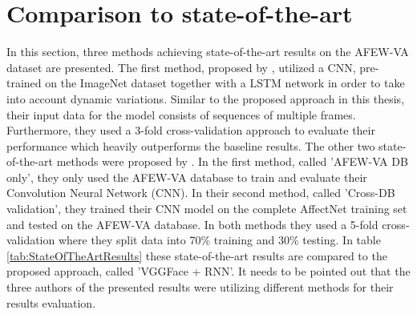 \section{Comparison to state-of-the-art}
In this section, three methods achieving state-of-the-art results on the AFEW-VA dataset are presented. The first method, proposed by \citet{Theagarajan:2018:DeepDriver}, utilized a CNN, pre-trained on the ImageNet dataset together with a LSTM network in order to take into account dynamic variations. Similar to the proposed approach in this thesis, their input data for the model consists of sequences of multiple frames. Furthermore, they used a 3-fold cross-validation approach to evaluate their performance which heavily outperforms the baseline results.
\newline\newline
The other two state-of-the-art methods were proposed by \citet{Handrich:2020:SimultaneousPredVA}. In the first method, called 'AFEW-VA DB only', they only used the AFEW-VA database to train and evaluate their Convolution Neural Network (CNN). In their second method, called 'Cross-DB validation', they trained their CNN model on the complete AffectNet training set and tested on the AFEW-VA database. In both methods they used a 5-fold cross-validation where they split data into 70\% training and 30\% testing.
\newline\newline
In table \ref{tab:StateOfTheArtResults} these state-of-the-art results are compared to the proposed approach, called 'VGGFace + RNN'. It needs to be pointed out that the three authors of the presented results were utilizing different methods for their results evaluation.

